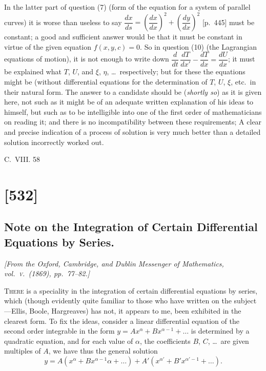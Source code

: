 \documentclass[11pt,a4paper]{book}
\begin{document}
In the latter part of question (7) (form of the equation for a system of parallel
curves) it is worse than useless to say $\dfrac{dx}{ds} = \left(\dfrac{dx}{dx}\right)^2 + \left(\dfrac{dy}{dx}\right)^2$ [p.~445] must be constant;
a good and sufficient answer would be that it must be constant in virtue of the given
equation $f(x, y, c) = 0$. So in question (10) (the Lagrangian equations of motion), it is
not enough to write down $\dfrac{d}{dt}\,\dfrac{dT}{dx'} - \dfrac{dT}{dx} = \dfrac{dU}{dx}$; it must be explained what $T$, $U$, and
$\xi$, $\eta$, \ldots\ respectively; but for these the equations might be (without differential equations
for the determination of $T$, $U$, $\xi$, etc.\ in their natural form. The answer to a candidate
should be (\textit{shortly so}) as it is given here, not such as it might be of an adequate written
explanation of his ideas to himself, but such as to be intelligible into one of the first order
of mathematicians on reading it; and there is no incompatibility between these requirements;
A clear and precise indication of a process of solution is very much better than a
detailed solution incorrectly worked out.

\hfill C.\ VIII.\hspace{2em} 58

\clearpage

\section{[532]}
\subsection{Note on the Integration of Certain Differential Equations by Series.}

\begin{center}
\textit{[From the Oxford, Cambridge, and Dublin Messenger of Mathematics, vol.~\textsc{v}.\ (1869), pp.~77--82.]}
\end{center}

\textsc{There} is a speciality in the integration of certain differential equations by
series, which (though evidently quite familiar to those who have written on the
subject---Ellis, Boole, Hargreaves) has not, it appears to me, been exhibited in the
clearest form. To fix the ideas, consider a linear differential equation of the second
order integrable in the form $y = Ax^\alpha + Bx^{\alpha-1} + \ldots$ is determined by a quadratic
equation, and for each value of $\alpha$, the coefficients $B$, $C$, \ldots\ are given multiples of $A$,
we have thus the general solution
\[
y = A(x^\alpha + Bx^{\alpha-1}\alpha + \ldots) + A'(x^{\alpha'} + B'x^{\alpha'-1} + \ldots).
\]
\end{document}
